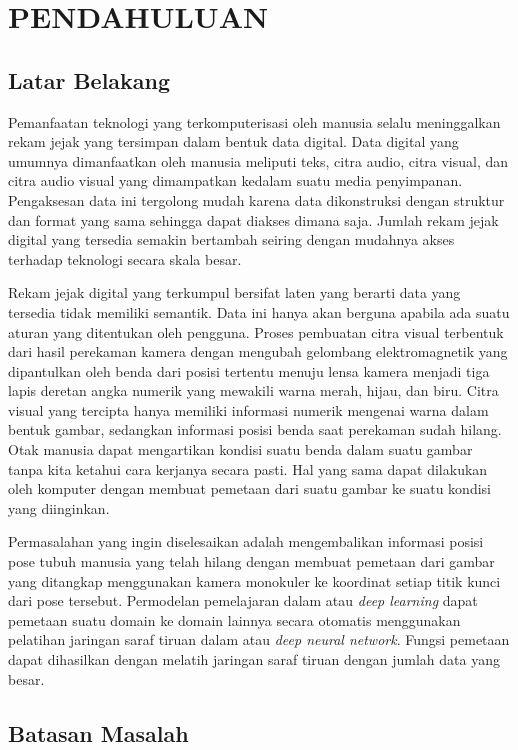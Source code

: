 
\chapter{PENDAHULUAN}
\label{cha:1-Pendahuluan}

\section{Latar Belakang}
\label{sec:1-LatarBelakang}

Pemanfaatan teknologi yang terkomputerisasi oleh manusia selalu meninggalkan rekam jejak yang
tersimpan dalam bentuk data digital. Data digital yang umumnya dimanfaatkan oleh manusia
meliputi teks, citra audio, citra visual, dan citra audio visual yang dimampatkan kedalam suatu
media penyimpanan. Pengaksesan data ini tergolong mudah karena data dikonstruksi dengan struktur
dan format yang sama sehingga dapat diakses dimana saja. Jumlah rekam jejak digital yang tersedia
semakin bertambah seiring dengan mudahnya akses terhadap teknologi secara skala besar.

Rekam jejak digital yang terkumpul bersifat laten yang berarti data yang tersedia tidak
memiliki semantik. Data ini hanya akan berguna apabila ada suatu aturan yang ditentukan
oleh pengguna. Proses pembuatan citra visual terbentuk dari hasil perekaman kamera dengan mengubah
gelombang elektromagnetik yang dipantulkan oleh benda dari posisi tertentu menuju lensa kamera
menjadi tiga lapis deretan angka numerik yang mewakili warna merah, hijau, dan biru. Citra visual
yang tercipta hanya memiliki informasi numerik mengenai warna dalam bentuk gambar, sedangkan
informasi posisi benda saat perekaman sudah hilang. Otak manusia dapat mengartikan kondisi suatu
benda dalam suatu gambar tanpa kita ketahui cara kerjanya secara pasti. Hal yang sama dapat
dilakukan oleh komputer dengan membuat pemetaan dari suatu gambar ke suatu kondisi yang diinginkan.

Permasalahan yang ingin diselesaikan adalah mengembalikan informasi posisi pose tubuh manusia yang
telah hilang dengan membuat pemetaan dari gambar yang ditangkap menggunakan kamera monokuler ke
koordinat setiap titik kunci dari pose tersebut.
Permodelan pemelajaran dalam atau \textit{deep learning} dapat pemetaan suatu domain ke
domain lainnya secara otomatis menggunakan pelatihan jaringan saraf tiruan dalam atau
\textit{deep neural network}. Fungsi pemetaan dapat dihasilkan dengan melatih jaringan saraf tiruan
dengan jumlah data yang besar.

\section{Batasan Masalah}
\label{sec:1-BatasMasalah}

